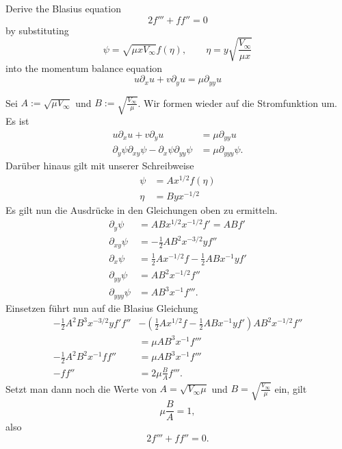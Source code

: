 \documentclass[12pt]{exam}
\newcommand{\del}{\partial}
\begin{document}
\begin{questions}
    
    \question Derive the Blasius equation
    \begin{equation*}
        2 f''' + ff'' = 0
    \end{equation*}
    by substituting
    \begin{equation*}
        \psi = \sqrt{\mu x V_{\infty}} f(\eta), \qquad \eta = y \sqrt{\frac{V_{\infty}}{\mu x}}
    \end{equation*}
    into the momentum balance equation
    \begin{equation*}
        u \del_x u + v \del_y u = \mu \del_{yy} u
    \end{equation*}
    
    \begin{solution}
        Sei $A := \sqrt{\mu V_{\infty}}$ und $B := \sqrt{\frac{V_{\infty}}{\mu}}$. Wir formen wieder auf die Stromfunktion um. Es ist
        \begin{align*}
            u \del_x u + v \del_y u &= \mu \del_{yy} u \\
            \del_y \psi \del_{xy} \psi - \del_x \psi \del_{yy} \psi &= \mu \del_{yyy} \psi.
        \end{align*}
        Darüber hinaus gilt mit unserer Schreibweise 
        \begin{align*}
            \psi &= A x^{1/2} f(\eta) \\
            \eta &= B y x^{-1/2}
        \end{align*}
        Es gilt nun die Ausdrücke in den Gleichungen oben zu ermitteln.
        \begin{align*}
            \del_y \psi  &= A B x^{1/2} x^{-1/2} f' = A B f' \\
            \del_{xy} \psi &= -\frac{1}{2} A B^2 x^{-3/2} y f'' \\
            \del_x \psi &= \frac{1}{2} A x^{-1/2} f - \frac{1}{2} A B x^{-1} y f' \\
            \del_{yy} \psi &= A B^2 x^{-1/2} f'' \\
            \del_{yyy} \psi &= A B^3 x^{-1} f'''.
        \end{align*}
        Einsetzen führt nun auf die Blasius Gleichung
        \begin{align*}
            -\frac{1}{2} A^2 B^3 x^{-3/2} y f' f'' &- \left( \frac{1}{2} A x^{1/2} f - \frac{1}{2} A B x^{-1} y f' \right) A B^2 x^{-1/2} f'' \\
            &= \mu A B^3 x^{-1} f''' \\
            -\frac{1}{2} A^2 B^2 x^{-1} f f'' &= \mu A B^3 x^{-1} f''' \\
            -f f'' &= 2 \mu \frac{B}{A} f'''.
        \end{align*}
        Setzt man dann noch die Werte von $A = \sqrt{V_{\infty} \mu}$ und $B = \sqrt{\frac{V_{\infty}}{\mu}}$ ein, gilt
        \begin{equation*}
            \mu \frac{B}{A} = 1,
        \end{equation*}
        also
        \begin{equation*}
            2 f''' + f f'' = 0.
        \end{equation*}
    \end{solution}
    

\end{questions}
\end{document}
